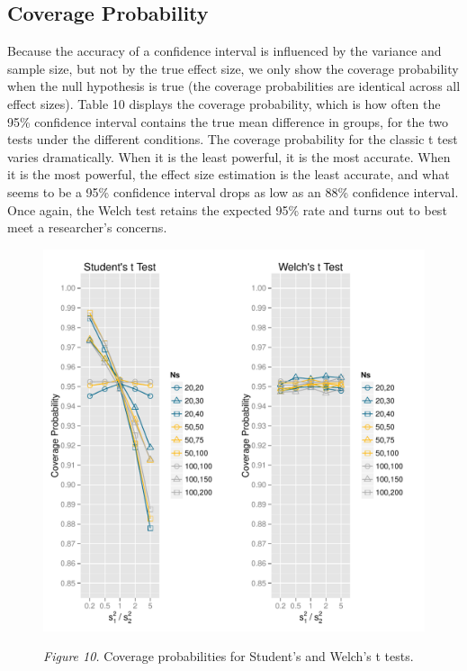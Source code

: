 \documentclass[man,a4paper,noextraspace,apacite]{apa6}\usepackage[]{graphicx}\usepackage[]{color}
\makeatletter
\def\maxwidth{ %
  \ifdim\Gin@nat@width>\linewidth
    \linewidth
  \else
    \Gin@nat@width
  \fi
}
\newenvironment{knitrout}{}{} %
\makeatother
\begin{document}
\subsection{Coverage Probability}
Because the accuracy of a confidence interval is influenced by the variance and sample size, but not by the true effect size, we only show the coverage probability when the null hypothesis is true (the coverage probabilities are identical across all effect sizes). Table 10 displays the coverage probability, which is how often the 95\% confidence interval contains the true mean difference in groups, for the two tests under the different conditions. The coverage probability for the classic t test varies dramatically. When it is the least powerful, it is the most accurate. When it is the most powerful, the effect size estimation is the least accurate, and what seems to be a 95\% confidence interval drops as low as an 88\% confidence interval. Once again, the Welch test retains the expected 95\% rate and turns out to best meet a researcher's concerns. 






\begin{figure}
\begin{knitrout}
\color{fgcolor}
\includegraphics[width=\maxwidth]{figure/coverage_plots} 

\end{knitrout}
\textit{Figure 10.} Coverage probabilities for Student's and Welch's t tests.
\end{figure}
\end{document}
